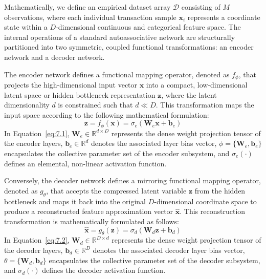 Mathematically, we define an empirical dataset array $\mathcal{D}$ consisting of $M$ observations, where each individual transaction sample $\mathbf{x}_i$ represents a coordinate state within a $D$-dimensional continuous and categorical feature space. The internal operations of a standard autoassociative network are structurally partitioned into two symmetric, coupled functional transformations: an encoder network and a decoder network.

The encoder network defines a functional mapping operator, denoted as $f_\phi$, that projects the high-dimensional input vector $\mathbf{x}$ into a compact, low-dimensional latent space or hidden bottleneck representation $\mathbf{z}$, where the latent dimensionality $d$ is constrained such that $d \ll D$. This transformation maps the input space according to the following mathematical formulation:
\begin{equation}\label{eq:7.1}
    \mathbf{z} = f_\phi(\mathbf{x}) = \sigma_e(\mathbf{W}_e \mathbf{x} + \mathbf{b}_e)
\end{equation}
In Equation~\eqref{eq:7.1}, $\mathbf{W}_e \in \mathbb{R}^{d \times D}$ represents the dense weight projection tensor of the encoder layers, $\mathbf{b}_e \in \mathbb{R}^d$ denotes the associated layer bias vector, $\phi = \{\mathbf{W}_e, \mathbf{b}_e\}$ encapsulates the collective parameter set of the encoder subsystem, and $\sigma_e(\cdot)$ defines an elemental, non-linear activation function.

Conversely, the decoder network defines a mirroring functional mapping operator, denoted as $g_\theta$, that accepts the compressed latent variable $\mathbf{z}$ from the hidden bottleneck and maps it back into the original $D$-dimensional coordinate space to produce a reconstructed feature approximation vector $\hat{\mathbf{x}}$. This reconstruction transformation is mathematically formulated as follows:
\begin{equation}\label{eq:7.2}
    \hat{\mathbf{x}} = g_\theta(\mathbf{z}) = \sigma_d(\mathbf{W}_d \mathbf{z} + \mathbf{b}_d)
\end{equation}
In Equation~\eqref{eq:7.2}, $\mathbf{W}_d \in \mathbb{R}^{D \times d}$ represents the dense weight projection tensor of the decoder layers, $\mathbf{b}_d \in \mathbb{R}^D$ denotes the associated decoder layer bias vector, $\theta = \{\mathbf{W}_d, \mathbf{b}_d\}$ encapsulates the collective parameter set of the decoder subsystem, and $\sigma_d(\cdot)$ defines the decoder activation function.

